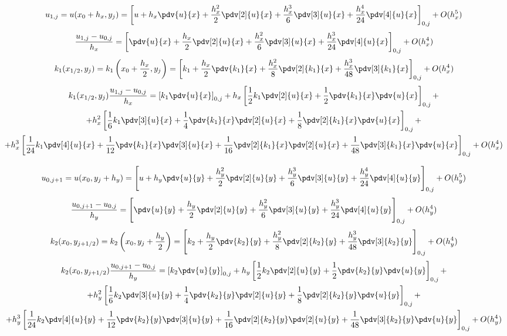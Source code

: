 \[
    u_{1,j} = u(x_{0} + h_x, y_{j}) = \left[ u + h_x \pdv{u}{x} + \frac{h_x^2}{2} \pdv[2]{u}{x} +
    \frac{h_x^3}{6} \pdv[3]{u}{x} + \frac{h_x^4}{24} \pdv[4]{u}{x} \right]_{0,j} + O(h_x^5)
\]
\[
    \frac{u_{1,j} - u_{0,j}}{h_x} = \left[ \pdv{u}{x} + \frac{h_x}{2} \pdv[2]{u}{x} +
    \frac{h_x^2}{6} \pdv[3]{u}{x} + \frac{h_x^3}{24} \pdv[4]{u}{x} \right]_{0,j} + O(h_x^4)
\]
\[
    k_1(x_{1/2},y_{j}) = k_1 \left( x_{0} + \frac{h_x}{2},y_{j} \right) = \left[
        k_1 + \frac{h_x}{2} \pdv{k_1}{x} + \frac{h_x^2}{8} \pdv[2]{k_1}{x} + \frac{h_x^3}{48} \pdv[3]{k_1}{x}
    \right]_{0,j} + O(h_x^4)
\]
\begin{multline*}
    k_1(x_{1/2},y_{j}) \frac{u_{1,j} - u_{0,j}}{h_x} = \left[ k_1 \pdv{u}{x} \right]_{0,j} +
    h_x \left[ \frac{1}{2} k_1 \pdv[2]{u}{x} + \frac{1}{2} \pdv{k_1}{x} \pdv{u}{x} \right]_{0,j} + \\
    + h_x^2 \left[ \frac{1}{6} k_1 \pdv[3]{u}{x} + \frac{1}{4} \pdv{k_1}{x} \pdv[2]{u}{x} + \frac{1}{8} \pdv[2]{k_1}{x} \pdv{u}{x} \right]_{0,j} + \\
    + h_x^3 \left[ \frac{1}{24} k_1 \pdv[4]{u}{x} + \frac{1}{12} \pdv{k_1}{x} \pdv[3]{u}{x} + \frac{1}{16} \pdv[2]{k_1}{x} \pdv[2]{u}{x} + \frac{1}{48} \pdv[3]{k_1}{x} \pdv{u}{x} \right]_{0,j} + O(h_x^4)
\end{multline*}

\[
    u_{0,j+1} = u(x_{0}, y_{j} + h_y) = \left[ u + h_y \pdv{u}{y} + \frac{h_y^2}{2} \pdv[2]{u}{y} +
    \frac{h_y^3}{6} \pdv[3]{u}{y} + \frac{h_y^4}{24} \pdv[4]{u}{y} \right]_{0,j} + O(h_y^5)
\]
\[
    \frac{u_{0,j+1} - u_{0,j}}{h_y} = \left[ \pdv{u}{y} + \frac{h_y}{2} \pdv[2]{u}{y} +
    \frac{h_y^2}{6} \pdv[3]{u}{y} + \frac{h_y^3}{24} \pdv[4]{u}{y} \right]_{0,j} + O(h_y^4)
\]
\[
    k_2(x_{0},y_{j+1/2}) = k_2 \left( x_{0},y_{j} + \frac{h_y}{2} \right) = \left[
        k_2 + \frac{h_y}{2} \pdv{k_2}{y} + \frac{h_y^2}{8} \pdv[2]{k_2}{y} + \frac{h_y^3}{48} \pdv[3]{k_2}{y}
    \right]_{0,j} + O(h_y^4)
\]
\begin{multline*}
    k_2(x_{0},y_{j+1/2}) \frac{u_{0,j+1} - u_{0,j}}{h_y} = \left[ k_2 \pdv{u}{y} \right]_{0,j} +
    h_y \left[ \frac{1}{2} k_2 \pdv[2]{u}{y} + \frac{1}{2} \pdv{k_2}{y} \pdv{u}{y} \right]_{0,j} + \\
    + h_y^2 \left[ \frac{1}{6} k_2 \pdv[3]{u}{y} + \frac{1}{4} \pdv{k_2}{y} \pdv[2]{u}{y} + \frac{1}{8} \pdv[2]{k_2}{y} \pdv{u}{y} \right]_{0,j} + \\
    + h_y^3 \left[ \frac{1}{24} k_2 \pdv[4]{u}{y} + \frac{1}{12} \pdv{k_2}{y} \pdv[3]{u}{y} + \frac{1}{16} \pdv[2]{k_2}{y} \pdv[2]{u}{y} + \frac{1}{48} \pdv[3]{k_2}{y} \pdv{u}{y} \right]_{0,j} + O(h_y^4)
\end{multline*}


